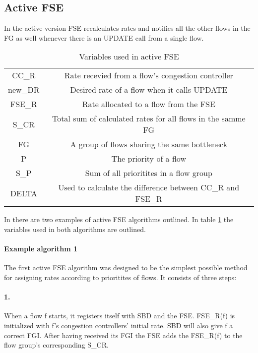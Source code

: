 \subsection{Active FSE}
In the active version FSE recalculates rates and notifies all the other flows in the FG as well whenever there is an UPDATE call from a single flow. 

\begin{table}
\begin{center}
    \begin{tabular}{|c|c|}
        \hline
        CC\_R & Rate recevied from a flow's congestion controller \\
        new\_DR & Desired rate of a flow when it calls UPDATE \\
        FSE\_R & Rate allocated to a flow from the FSE \\
        S\_CR & Total sum of calculated rates for all flows in the samme FG \\ 
        FG & A group of flows sharing the same bottleneck \\
        P & The priority of a flow \\
        S\_P & Sum of all prioritites in a flow group \\
        DELTA & Used to calculate the difference between CC\_R and FSE\_R \\  
        \hline
    \end{tabular}
\end{center}
\caption{Variables used in active FSE}
\label{active_fse_variables}
\end{table}

In \cite{rfc8699} there are two examples of active FSE algorithms outlined.
In table \ref{active_fse_variables} the variables used in both algorithms are outlined. 

\paragraph{Example algorithm 1}
The first active FSE algorithm was designed to be the simplest possible method for assigning rates according to prioritites of flows. 
It consists of three steps:
\paragraph{1.}
When a flow f starts, it registers itself with SBD and the FSE. 
FSE\_R(f) is initialized with f's congestion controllers' initial rate. 
SBD will also give f a correct FGI.
After having received its FGI the FSE adds the FSE\_R(f) to the flow group's corresponding S\_CR.
